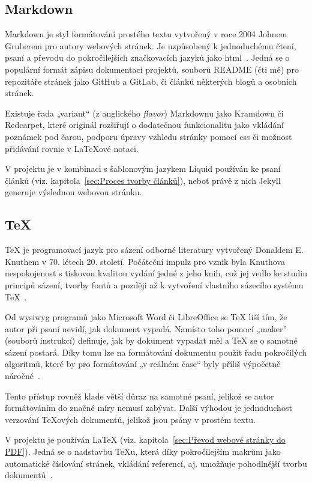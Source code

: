 \documentclass[a4paper, 12pt, twoside]{article}
\begin{document}
  \subsection{Markdown} \label{sec:Markdown}
  Markdown je styl formátování prostého textu vytvořený v roce 2004 Johnem Gruberem pro autory webových stránek. Je uzpůsobený k jednoduchému čtení, psaní a převodu do pokročilejších značkovacích jazyků jako \gls{html}~\cite{markdown-history}. Jedná se o populární formát zápisu dokumentací projektů, souborů README (čti mě) pro repozitáře stránek jako GitHub a GitLab, či článků některých blogů a osobních stránek.

  Existuje řada „variant“ (z anglického \textit{flavor}) Markdownu jako Kramdown či Redcarpet, které originál rozšiřují o dodatečnou funkcionalitu jako vkládání poznámek pod čarou, podporu úpravy vzhledu stránky pomocí \gls{css} či možnost přidávání rovnic v \LaTeX ové notaci.

  V projektu je v kombinaci s šablonovým jazykem Liquid používán ke psaní článků (viz. kapitola~\ref{sec:Proces tvorby článků}), neboť právě z nich Jekyll generuje výslednou webovou stránku.


  \subsection{\TeX} \label{sec:TeX}
  \TeX{} je programovací jazyk pro sázení odborné literatury vytvořený Donaldem E. Knuthem v 70. létech 20. století. Počáteční impulz pro vznik byla Knuthova nespokojenost s tiskovou kvalitou vydání jedné z jeho knih, což jej vedlo ke studiu principů sázení, tvorby fontů a později až k vytvoření vlastního sázecího systému \TeX{}~\cite{tex-history}.

  Od \gls{wysiwyg} programů jako Microsoft Word či LibreOffice se \TeX{} liší tím, že autor při psaní nevidí, jak dokument vypadá. Namísto toho pomocí „maker” (souborů instrukcí) definuje, jak by dokument vypadat měl a \TeX{} se o samotné sázení postará. Díky tomu lze na formátování dokumentu použít řadu pokročilých algoritmů, které by pro formátování „v reálném čase“ byly příliš výpočetně náročné~\cite{tex-history}.

  Tento přístup rovněž klade větší důraz na samotné psaní, jelikož se autor formátováním do značné míry nemusí zabývat. Další výhodou je jednoduchost verzování \TeX ových dokumentů, jelikož jsou psány v prostém textu.

  V projektu je používán \LaTeX{} (viz. kapitola~\ref{sec:Převod webové stránky do PDF}). Jedná se o nadstavbu \TeX u, která díky pokročilejším makrům jako automatické číslování stránek, vkládání referencí, aj. umožňuje pohodlnější tvorbu dokumentů~\cite{getting-started-with-latex}.
\end{document}
